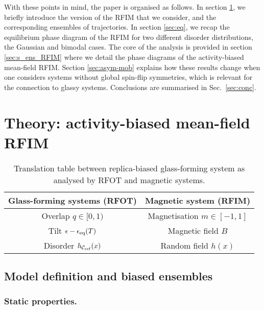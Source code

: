 \documentclass{iopart}
\begin{document}
With these points in mind, the paper is organised as follows. In section \ref{sec:th}, we briefly introduce the version of the RFIM that we consider, and the corresponding ensembles of trajectories. In section \ref{sec:eq}, we recap the equilibrium phase diagram of the RFIM for two different disorder distributions, the Gaussian and bimodal cases. 
The core of the analysis is provided in section \ref{sec:s_ens_RFIM} where we detail the phase diagrams of the activity-biased mean-field RFIM. 
Section \ref{sec:asym-mob} explains how these results change when one considers systems without global spin-flip symmetries, which is relevant for the connection to glassy systems.  Conclusions are summarised in Sec.~\ref{sec:conc}.

\section{Theory: activity-biased mean-field RFIM}\label{sec:th}

\begin{table}
\raggedleft
  \begin{tabular}{|c|c|}
    \hline
    Glass-forming systems (RFOT) & Magnetic system (RFIM) \\
    \hline \hline
    Overlap $q \in [0,1)$                  & Magnetisation $m\in[-1,1]$ \\
    \hline
    Tilt $\epsilon-\epsilon_{\rm eq}(T)$              & Magnetic field $B$ \\
    \hline
    Disorder $h_{\mathcal{C}_{\rm ref}}(x)$ & Random field $h(x)$   \\
    \hline
  \end{tabular}
  \caption{Translation table between replica-biased glass-forming system as analysed by RFOT and magnetic systems.}
  \label{tab:translation_table}
\end{table}


\subsection{Model definition and biased ensembles}\label{sec:model_def}

\subsubsection{Static properties.}
\end{document}
